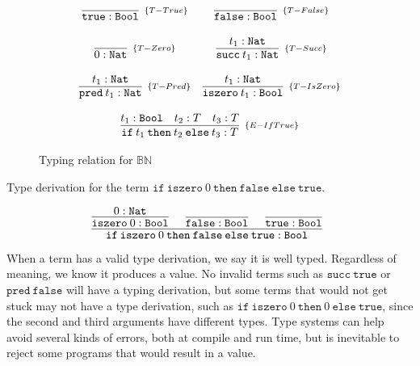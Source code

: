 \begin{figure*}[!h]
    \[
        \begin{array}{cc}
            \infer[_{\{T-True\}}]{\texttt{true} : \texttt{Bool}}{}
            &
            \infer[_{\{T-False\}}]{\texttt{false} : \texttt{Bool}}{}
            \\ \\
            \infer[_{\{T-Zero\}}]{0 : \texttt{Nat}}{}
            &
            \infer[_{\{T-Succ\}}]{\texttt{succ}\:t_1 : \texttt{Nat}}{t_1 : \texttt{Nat}}
            \\ \\
            \infer[_{\{T-Pred\}}]{\texttt{pred}\:t_1 : \texttt{Nat}}{t_1 : \texttt{Nat}}
            &
            \infer[_{\{T-IsZero\}}]{\texttt{iszero}\:t_1 : \texttt{Bool}}{t_1 : \texttt{Nat}}
            \\ \\
            \multicolumn{2}{c}{
                \infer[_{\{E-IfTrue\}}]{
                    \texttt{if}\:t_1\:\texttt{then}\:t_2\:\texttt{else}\:t_3 : T
                }{
                    t_1 : \texttt{Bool} & t_2 : T & t_3 : T
                }
            }
        \end{array}
    \]
    \centering
    \caption{Typing relation for \(\mathbb{B}\mathbb{N}\)}
    \label{fig:bn-typing-relation}
\end{figure*}

\begin{example}
    Type derivation for the term \(\texttt{if}\:\texttt{iszero}\:0\:\texttt{then}\:\texttt{false}\:\texttt{else}\:\texttt{true}\).

    \[
        \infer[]{
            \texttt{if}\:\texttt{iszero}\:0\:\texttt{then}\:\texttt{false}\:\texttt{else}\:\texttt{true} : \texttt{Bool}
        }{
            \infer[]{
                \texttt{iszero}\:0 : \texttt{Bool}
            }{
                0 : \texttt{Nat}
            }
            &
            \infer[]{\texttt{false} : \texttt{Bool}}{}
            &
            \infer[]{\texttt{true} : \texttt{Bool}}{}
        }
    \]
\end{example}

When a term has a valid type derivation, we say it is well typed. Regardless of
meaning, we know it produces a value. No invalid terms such as \(\texttt{succ}\:
\texttt{true}\) or \(\texttt{pred}\:\texttt{false}\) will have a typing derivation,
but some terms that would not get stuck may not have a type derivation, such as
\(\texttt{if}\:\texttt{iszero}\:0\:\texttt{then}\:0\:\texttt{else}\:\texttt{true}\),
since the second and third arguments have different types. Type systems can help
avoid several kinds of errors, both at compile and run time, but is inevitable to
reject some programs that would result in a value.

